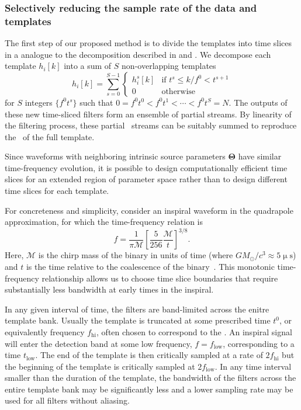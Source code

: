 \subsubsection{Selectively reducing the sample rate of the data and templates}
\label{sec:time-slices}

The first step of our proposed method is to divide the templates into time
slices in a \TD{} analogue to the \FD{} decomposition described
in \citet{Marion2004} and \citet{Buskulic2010}.  We decompose each template
$h_{i}[k]$ into a sum of $S$ non-overlapping templates
%
\begin{equation}
\label{eq:time-slices}
h_{i}[k] = \sum_{s=0}^{S-1}
	\begin{cases}
		h_i^s[k] & \textrm{if } t^s \leqslant k / f^0 < t^{s+1} \\
		0 & \textrm{otherwise}
	\end{cases}
\end{equation}
%
for $S$ integers $\{f^0 t^s\}$ such that $0  = f^0 t^0 < f^0 t^1 < \cdots < f^0
t^S = N$.  The outputs of these new time-sliced filters
form an ensemble of partial \SNR{} streams.  By linearity of the filtering
process, these partial \SNR\ streams can be suitably summed to reproduce the
\SNR\ of the full template.

Since waveforms with neighboring intrinsic source parameters $\mathbf\Theta$
 have similar time-frequency evolution, it is possible to design computationally
efficient time slices for an extended region of parameter space rather than to
design different time slices for each template.

For concreteness and simplicity, consider an inspiral waveform in the
quadrapole approximation, for which the time-frequency relation is
%
\begin{equation} \label{eq:fgw}
%
f = \frac{1}{\mathcal{\pi M}} \left[ \frac{5}{256}\frac{\mathcal{M}}{t}
\right]^{3/8}.
%
\end{equation}
%
Here, $\mathcal{M}$ is the chirp mass of the binary in units of time (where $G
M_\odot / c^3 \approx 5 \upmu\mathrm{s}$) and $t$ is the time relative to the
coalescence of the binary~\citep{findchirppaper, kidder1992}.
This monotonic time-frequency relationship allows us
to choose time slice boundaries that require substantially less bandwidth at
early times in the inspiral.

In any given interval of time, the filters are band-limited across the enitre
template bank. Usually the template is truncated at some prescribed time $t^0$,
or equivalently frequency $f_\mathrm{hi}$, often chosen to correspond to the
\ISCO. An inspiral signal will enter the detection band at some low frequency,
$f = f_\mathrm{low}$, corresponding to a time $t_\mathrm{low}$.  The end of the
template is then critically sampled at a rate of $2 f_\mathrm{hi}$ but the 
beginning of the template is critically sampled at $2 f_\mathrm{low}$. In any
time interval smaller than the duration of the template, the bandwidth of the
filters across the entire template bank may be significantly less and
a lower sampling rate may be used for all filters without aliasing.

